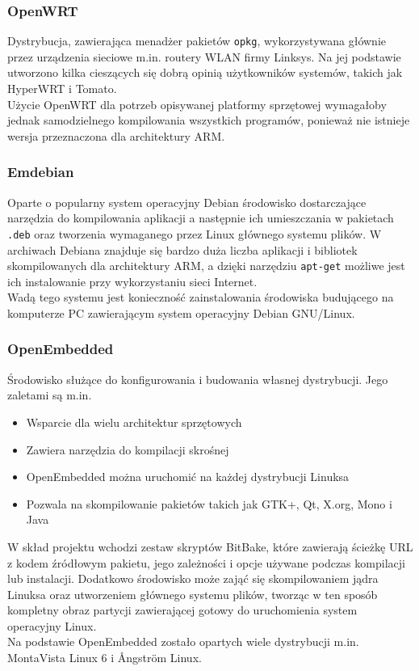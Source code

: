 \documentclass[a4paper,12pt]{book}
\begin{document}
				\subsubsection{OpenWRT}
					Dystrybucja, zawierająca menadżer pakietów \texttt{opkg}, wykorzystywana głównie przez urządzenia sieciowe m.in. routery WLAN firmy Linksys. Na jej podstawie utworzono kilka cieszących się dobrą opinią użytkowników systemów, takich jak HyperWRT i Tomato.\\
					Użycie OpenWRT dla potrzeb opisywanej platformy sprzętowej wymagałoby jednak samodzielnego kompilowania wszystkich programów, ponieważ nie istnieje wersja przeznaczona dla architektury ARM.
				\subsubsection{Emdebian}
					Oparte o popularny system operacyjny Debian środowisko dostarczające narzędzia do kompilowania aplikacji a następnie ich umieszczania w pakietach \texttt{.deb} oraz tworzenia wymaganego przez Linux głównego systemu plików. W archiwach Debiana znajduje się bardzo duża liczba aplikacji i bibliotek skompilowanych dla architektury ARM, a dzięki narzędziu \texttt{apt-get} możliwe jest ich instalowanie przy wykorzystaniu sieci Internet.\\
					Wadą tego systemu jest konieczność zainstalowania środowiska budującego na komputerze PC zawierającym system operacyjny Debian GNU/Linux.
				\subsubsection{OpenEmbedded}
					Środowisko służące do konfigurowania i budowania własnej dystrybucji. Jego zaletami są m.in.
					\begin{itemize}
						\item Wsparcie dla wielu architektur sprzętowych
						\item Zawiera narzędzia do kompilacji skrośnej
						\item OpenEmbedded można uruchomić na każdej dystrybucji Linuksa
						\item Pozwala na skompilowanie pakietów takich jak GTK+, Qt, X.org, Mono i Java
					\end{itemize}
					W skład projektu wchodzi zestaw skryptów BitBake, które zawierają ścieżkę URL z kodem źródłowym pakietu, jego zależności i opcje używane podczas kompilacji lub instalacji. Dodatkowo środowisko może zająć się skompilowaniem jądra Linuksa oraz utworzeniem głównego systemu plików, tworząc w ten sposób kompletny obraz partycji zawierającej gotowy do uruchomienia system operacyjny Linux.\\
					Na podstawie OpenEmbedded zostało opartych wiele dystrybucji m.in. MontaVista Linux 6 i \r{A}ngstr\"{o}m Linux.
\end{document}
